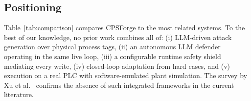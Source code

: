 \subsection{Positioning}

Table~\ref{tab:comparison} compares CPSForge to the most related systems. To the best of our knowledge, no prior work combines all of: (i) LLM-driven attack generation over physical process tags, (ii) an autonomous LLM defender operating in the same live loop, (iii) a configurable runtime safety shield mediating every write, (iv) closed-loop adaptation from hard cases, and (v) execution on a real PLC with software-emulated plant simulation. The survey by Xu et al.~\cite{xu2024llm_cybersec_survey} confirms the absence of such integrated frameworks in the current literature.

\begin{table}[t]
\centering
\caption{Comparison of CPSForge with related systems.}
\label{tab:comparison}
\end{table}
